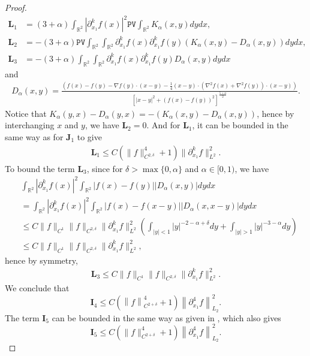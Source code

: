 \documentclass[reqno]{amsart}%
\theoremstyle{definition}
\theoremstyle{remark}
\numberwithin{equation}{section}
\newcommand{\0}{\mathbf{0}}
\newcommand{\1}{\mathbf{1}}
\newcommand{\R}{\mathbb R}
\newcommand{\PV}{\texttt{PV}}
\numberwithin{equation}{section}
\numberwithin{theorem}{section}
\numberwithin{figure}{section}
\begin{document}
\begin{proof}
\begin{align*}
\mathbf{L}_1&=(3+\alpha)\int_{\R^2}|\partial_{x_1}^kf(x)|^2\PV\int_{\R^2}K_{\alpha}(x,y)dydx,\\
\mathbf{L}_2&=-(3+\alpha)\PV\int_{\R^2}\int_{\R^2}\partial_{x_1}^kf(x)\partial_{x_1}^kf(y)(K_{\alpha}(x,y)-D_{\alpha}(x,y))dydx,\\
\mathbf{L}_3&=-(3+\alpha)\int_{\R^2}\int_{\R^2}\partial_{x_1}^kf(x)\partial_{x_1}^kf(y)D_{\alpha}(x,y)dydx
\end{align*}
and
\begin{align*}
D_{\alpha}(x,y)=\frac{(f(x)-f(y)-\nabla f(y)\cdot(x-y)-\frac{1}{4}(x-y)\cdot(\nabla^2f(x)+\nabla^2f(y))\cdot(x-y))}{\left[ |x-y|^2 + \left(f(x) - f(y)\right)^2 \right]^{\frac{5 + \alpha}{2}}}.
\end{align*}
Notice that $K_{\alpha}(y,x)-D_{\alpha}(y,x)=-(K_{\alpha}(x,y)-D_{\alpha}(x,y))$, hence by interchanging $x$ and $y$, we have $\mathbf{L}_2=0$. And for $\mathbf{L}_1$, it can be bounded in the same way as for $\mathbf{J}_1$ to give
\begin{align*}
\mathbf{L}_1\le C(\|f\|^4_{C^{2,\delta}}+1)\|\partial^k_{x_1}f\|^2_{L^2}.
\end{align*}
To bound the term $\mathbf{L}_3$, since for $\delta>\max\{0,\alpha\}$ and $\alpha\in[0,1)$, we have
\begin{align*}
&\int_{\R^2}|\partial_{x_1}^kf(x)|^2\int_{\R^2}|f(x)-f(y)||D_{\alpha}(x,y)|dydx\\
&=\int_{\R^2}|\partial_{x_1}^kf(x)|^2\int_{\R^2}|f(x)-f(x-y)||D_{\alpha}(x,x-y)|dydx\\
&\le C\|f\|_{C^1}\|f\|_{C^{2,\delta}}\|\partial_{x_1}^kf\|^2_{L^2}\left(\int_{|y|<1}|y|^{-2-\alpha+\delta}dy+\int_{|y|>1}|y|^{-3-\alpha}dy\right)\\
&\le C\|f\|_{C^1}\|f\|_{C^{2,\delta}}\|\partial_{x_1}^kf\|^2_{L^2},
\end{align*}
hence by symmetry,
\begin{align*}
\mathbf{L}_3\le C\|f\|_{C^1}\|f\|_{C^{2,\delta}}\|\partial_{x_1}^kf\|^2_{L^2}.
\end{align*}
We conclude that
\begin{equation}\label{bound on I4}
\mathbf{I}_4 \leq C ( \left\|f\right\|_{C^{2+ \delta}}^4  + 1 ) \left\|\partial_{x_1}^4 f \right\|_{L_2}^2.
\end{equation}
The term $\mathbf{I}_5$ can be bounded in the same way as given in \cite{CG07}, which also gives
\begin{equation}\label{bound on I5}
\mathbf{I}_5\le C (\|f\|_{C^{2+ \delta}}^4+1)\left\|\partial_{x_1}^4 f \right\|_{L_2}^2.

\end{equation}
\end{proof}
\end{document}
